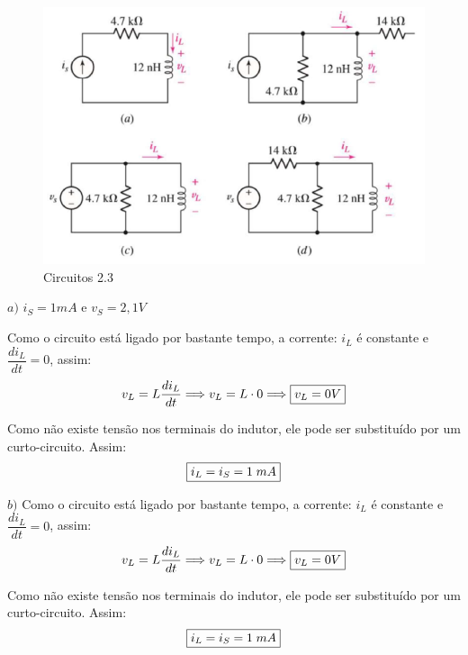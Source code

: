 \documentclass[
	12pt,				%
	oneside,			%
	a4paper,			%
	english,			%
	french,				%
	spanish,			%
	brazil				%
	]{abntex2}
\begin{document}
\begin{figure}[htb]
	\centering
	\includegraphics[scale=0.5]{2-3.PNG}
	\caption{Circuitos 2.3}
\end{figure}

$a)$ $i_S = 1mA$ e $v_S=2,1V$

Como o circuito está ligado por bastante tempo, a corrente: $i_L$ é constante e $\dfrac{d i_L}{dt} = 0$, assim:
\begin{equation}
    \centering
    v_L = L\dfrac{d i_L}{dt} \Longrightarrow v_L = L \cdot 0 \Longrightarrow \fbox{$v_L = 0V$}
\end{equation}

Como não existe tensão nos terminais do indutor, ele pode ser substituído por um curto-circuito. Assim:
\begin{equation}
    \fbox{$i_L = i_S = 1\;mA$}
\end{equation}

$b)$ Como o circuito está ligado por bastante tempo, a corrente: $i_L$ é constante e $\dfrac{d i_L}{dt} = 0$, assim:
\begin{equation}
    \centering
    v_L = L\dfrac{d i_L}{dt} \Longrightarrow v_L = L \cdot 0 \Longrightarrow \fbox{$v_L = 0V$}
\end{equation}

Como não existe tensão nos terminais do indutor, ele pode ser substituído por um curto-circuito. Assim:
\begin{equation}
    \fbox{$i_L = i_S = 1\;mA$}
\end{equation}
\end{document}

